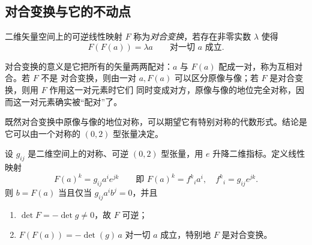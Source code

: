 \subsection{对合变换与它的不动点}

\begin{definition}[对合变换]
二维矢量空间上的可逆线性映射 $F$ 称为\emph{对合变换}，若存在非零实数 $\lambda$ 使得
\[
F(F(a))=\lambda a\qquad\text{对一切 }a\text{ 成立}.
\]
\end{definition}

对合变换的意义是它把所有的矢量两两配对：$a$ 与 $F(a)$ 配成一对，称为互相对合。若 $F$ 不是
对合变换，则由一对 $a,F(a)$ 可以区分原像与像；若 $F$ 是对合变换，则用 $F$ 作用这一对元素时它们
同时变成对方，原像与像的地位完全对称，因而这一对元素确实被“配对”了。

既然对合变换中原像与像的地位对称，可以期望它有特别对称的代数形式。结论是它可以由一个对称的
$(0,2)$ 型张量决定。

\begin{theorem}[对合变换由对称可逆张量决定]\label{thm:involution}
设 $g_{ij}$ 是二维空间上的对称、可逆 $(0,2)$ 型张量，用 $e$ 升降二维指标。定义线性映射
\[
F(a)^k=g_{ij}a^ie^{jk}\qquad\text{即 }F(a)^k={f^k}_ia^i,\quad {f^k}_i=g_{ij}e^{jk}.
\]
则 $b=F(a)$ 当且仅当 $g_{ij}a^ib^j=0$，并且
\begin{enumerate}
\item $\det F=-\det g\ne0$，故 $F$ 可逆；
\item $F(F(a))=-\det(g)\,a$ 对一切 $a$ 成立，特别地 $F$ 是对合变换。
\end{enumerate}
\end{theorem}

